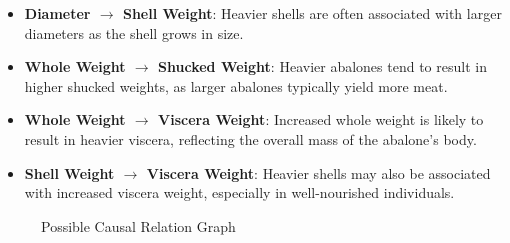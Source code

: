 \documentclass{article}
\begin{document}
\begin{minipage}[t]{0.7\linewidth}
\begin{itemize}
\item \textbf{Diameter $\rightarrow$ Shell Weight}: Heavier shells are often associated with larger diameters as the shell grows in size.
\item \textbf{Whole Weight $\rightarrow$ Shucked Weight}: Heavier abalones tend to result in higher shucked weights, as larger abalones typically yield more meat.
\item \textbf{Whole Weight $\rightarrow$ Viscera Weight}: Increased whole weight is likely to result in heavier viscera, reflecting the overall mass of the abalone's body.
\item \textbf{Shell Weight $\rightarrow$ Viscera Weight}: Heavier shells may also be associated with increased viscera weight, especially in well-nourished individuals.
\end{itemize}
\end{minipage}
\hspace{0.05\textwidth}
\begin{minipage}[t]{0.3\linewidth}
\begin{figure}[H]
\centering
{}
\caption{\label{fig:relation}Possible Causal Relation Graph}
\end{figure}
\end{minipage}
\end{document}
